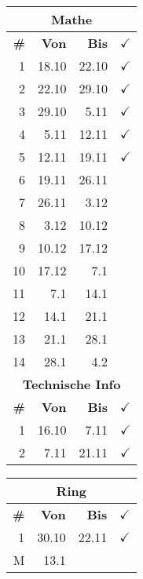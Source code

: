 \documentclass{article}
\begin{document}
\begin{table}
\begin{tabular}{r|r|r|l}
        \multicolumn{4}{c}{\textbf{Mathe}}\\
        \hline
        \hline
        \textbf{\#}&
        \textbf{Von}&
        \textbf{Bis}&
        $\checkmark$\\
        \hline
        \hline
        \color{teal}
        1&18.10&22.10&$\checkmark$\\
        \color{teal}
        2&22.10&29.10&$\checkmark$\\
        \color{teal}
        3&29.10&5.11&$\checkmark$\\
        \color{teal}
        4&5.11&12.11&$\checkmark$\\
        \color{teal}
        5&12.11&19.11&$\checkmark$\\
        \color{teal}
        6&19.11&26.11\\
        7&26.11&3.12\\
        8&3.12&10.12\\
        9&10.12&17.12\\
        10&17.12&7.1\\
        11&7.1&14.1\\
        12&14.1&21.1\\
        13&21.1&28.1\\
        14&28.1&4.2\\
        \hline
        \hline
        \multicolumn{4}{c}{\textbf{Technische Info}}\\
        \hline
        \hline
        \textbf{\#}&
        \textbf{Von}&
        \textbf{Bis}&
        $\checkmark$\\
        \hline
        \hline
        \color{teal}
        1&16.10&7.11&$\checkmark$\\
        \color{teal}
        2&7.11&21.11&$\checkmark$\\
        \hline
        \hline
    \end{tabular}
    \begin{tabular}{r|r|r|l}
        \multicolumn{4}{c}{\textbf{Ring}}\\
        \hline
        \hline
        \textbf{\#}&
        \textbf{Von}&
        \textbf{Bis}&
        $\checkmark$\\
        \hline
        \hline
        \color{teal}
        1&30.10&22.11&$\checkmark$\\
        M&13.1&\\
        \hline
        \hline


\end{tabular}
\end{table}
\end{document}
